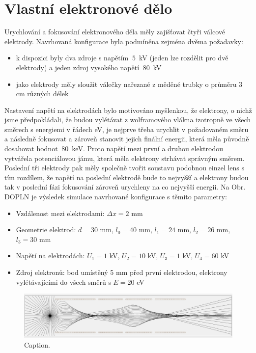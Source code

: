 \section{Vlastní elektronové dělo}

Urychlování a fokusování elektronového děla měly zajišťovat čtyři válcové elektrody. Navrhovaná konfigurace byla podmíněna zejména dvěma požadavky:
\begin{itemize}
	\item k dispozici byly dva zdroje s napětím $~5$~kV (jeden lze rozdělit pro dvě elektrody) a jeden zdroj vysokého napětí $~80$~kV
	\item jako elektrody měly sloužit válečky nařezané z měděné trubky o průměru 3 cm různých délek
\end{itemize}

Nastavení napětí na elektrodách bylo motivováno myšlenkou, že elektrony, o nichž jsme předpokládali, že budou vylétávat z wolframového vlákna izotropně ve všech směrech s energiemi v řádech eV, je nejprve třeba urychlit v požadovaném směru a následně fokusovat a zároveň stanovit jejich finální energii, která měla původně dosahovat hodnot $~80$~keV. Proto napětí mezi první a druhou elektrodou vytvářela potenciálovou jámu, která měla elektrony strhávat správným směrem. Poslední tři elektrody pak měly společně tvořit soustavu podobnou einzel lens s tím rozdílem, že napětí na poslední elektrodě bude to nejvyšší a elektrony budou tak v poslední fázi fokusování zároveň urychleny na co nejvyšší energii. Na Obr. DOPLN je výsledek simulace navrhované konfigurace s těmito parametry:
\begin{itemize}
	\item Vzdálenost mezi elektrodami: $\Delta x = 2$ mm
	\item Geometrie elektrod: $d = 30$ mm, $l_0 = 40$ mm, $l_1 = 24$ mm, $l_2 = 26$ mm, $l_3 = 30$ mm
	\item Napětí na elektrodách: $U_1 = 1$ kV, $U_2 = 10$ kV, $U_3 = 1$ kV, $U_4 = 60$ kV
	\item Zdroj elektronů: bod umístěný 5 mm před první elektrodou, elektrony vylétávajícími do všech směrů s $E = 20$ eV
\end{itemize}

\begin{figure}[htbp!]
\centering
\includegraphics[width = 366 pt]{Figure/05/2a.jpg}
\caption{Caption.}
\label{05simulaceVlastniDelo}
\end{figure}

